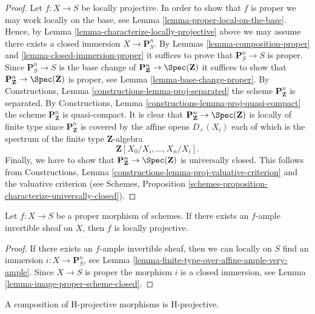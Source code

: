 \begin{proof}
Let $f : X \to S$ be locally projective.
In order to show that $f$ is proper we may work locally on the
base, see Lemma \ref{lemma-proper-local-on-the-base}.
Hence, by Lemma \ref{lemma-characterize-locally-projective}
above we may assume there exists a closed immersion $X \to \mathbf{P}^n_S$.
By Lemmas \ref{lemma-composition-proper}
and \ref{lemma-closed-immersion-proper} it suffices to prove that
$\mathbf{P}^n_S \to S$ is proper. Since
$\mathbf{P}^n_S \to S$ is the base change of
$\mathbf{P}^n_{\mathbf{Z}} \to \Spec(\mathbf{Z})$ it suffices
to show that $\mathbf{P}^n_{\mathbf{Z}} \to \Spec(\mathbf{Z})$
is proper, see Lemma \ref{lemma-base-change-proper}.
By Constructions, Lemma \ref{constructions-lemma-proj-separated} the scheme
$\mathbf{P}^n_{\mathbf{Z}}$ is separated.
By Constructions, Lemma \ref{constructions-lemma-proj-quasi-compact} the scheme
$\mathbf{P}^n_{\mathbf{Z}}$ is quasi-compact.
It is clear that $\mathbf{P}^n_{\mathbf{Z}} \to \Spec(\mathbf{Z})$
is locally of finite type since $\mathbf{P}^n_{\mathbf{Z}}$ is
covered by the affine opens $D_{+}(X_i)$ each of which is the
spectrum of the finite type $\mathbf{Z}$-algebra
$$
\mathbf{Z}[X_0/X_i, \ldots, X_n/X_i].
$$
Finally, we have to show that
$\mathbf{P}^n_{\mathbf{Z}} \to \Spec(\mathbf{Z})$
is universally closed. This follows from
Constructions, Lemma \ref{constructions-lemma-proj-valuative-criterion}
and the valuative criterion (see Schemes,
Proposition \ref{schemes-proposition-characterize-universally-closed}).
\end{proof}

\begin{lemma}
\label{lemma-proper-ample-locally-projective}
Let $f : X \to S$ be a proper morphism of schemes. If there exists
an $f$-ample invertible sheaf on $X$, then $f$ is locally projective.
\end{lemma}

\begin{proof}
If there exists an $f$-ample invertible sheaf, then we can locally
on $S$ find an immersion $i : X \to \mathbf{P}^n_S$, see
Lemma \ref{lemma-finite-type-over-affine-ample-very-ample}. Since $X \to S$
is proper the morphism $i$ is a closed immersion, see
Lemma \ref{lemma-image-proper-scheme-closed}.
\end{proof}

\begin{lemma}
\label{lemma-H-projective-composition}
A composition of H-projective morphisms is H-projective.
\end{lemma}

